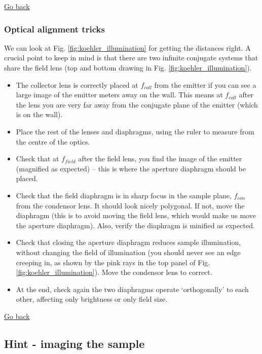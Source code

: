 \documentclass[a4paper]{report}
\begin{document}
    \noindent
    \hyperlink{hintBack-illumination}{Go back}
    
    
	\subsubsection{Optical alignment tricks}
	We can look at Fig. \ref{fig:koehler_illumination} for getting the distances right. A crucial point to keep in mind is that there are two infinite conjugate systems that share the field lens (top and bottom drawing in Fig. \ref{fig:koehler_illumination}).
	
	\begin{itemize}
	    \item The collector lens is correctly placed at $f_{coll}$ from the emitter if you can see a large image of the emitter meters away on the wall. This means at $f_{coll}$ after the lens you are very far away from the conjugate plane of the emitter (which is on the wall).
	    \item Place the rest of the lenses and diaphragms, using the ruler to measure from the centre of the optics. 
	    \item Check that at $f_{field}$ after the field lens, you find the image of the emitter (magnified as expected) -- this is where the aperture diaphragm should be placed.
	    \item Check that the field diaphragm is in sharp focus in the sample plane, $f_{con}$ from the condensor lens. It should look nicely polygonal. If not, move the diaphragm (this is to avoid moving the field lens, which would make us move the aperture diaphragm). Also, verify the diaphragm is minified as expected.
	    \item Check that closing the aperture diaphragm reduces sample illumination, without changing the field of illumination (you should never see an edge creeping in, as shown by the pink rays in the top panel of Fig. \ref{fig:koehler_illumination}). Move the condensor lens to correct.
	    \item At the end, check again the two diaphragms operate `orthogonally' to each other, affecting only brightness or only field size.

	\end{itemize}
	
    \noindent
    \hyperlink{hintBack-illumination}{Go back}
    \clearpage
    
    \subsection{Hint - imaging the sample}
	\hypertarget{hintTo-imaging}{}
	
\end{document}
